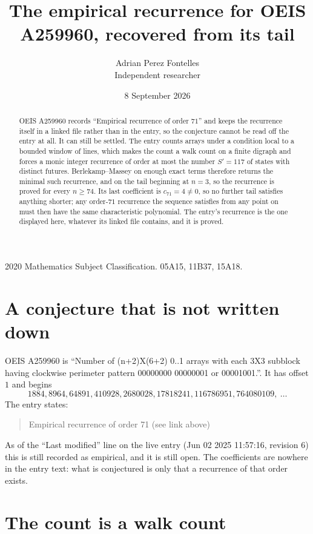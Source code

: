 \documentclass[11pt,a4paper]{article}
\title{The empirical recurrence for OEIS A259960, recovered from its tail}
\author{Adrian Perez Fontelles\\ \small Independent researcher}
\date{8 September 2026}
\theoremstyle{plain}
\theoremstyle{definition}
\begin{document}
\maketitle

\begin{abstract}
OEIS A259960 records ``Empirical recurrence of order $71$'' and keeps the recurrence itself in
a linked file rather than in the entry, so the conjecture cannot be read off the entry at all.
It can still be settled. The entry counts arrays under a condition local to a bounded window of
lines, which makes the count a walk count on a finite digraph and forces a monic integer
recurrence of order at most the number $S'=117$ of states with distinct futures. Berlekamp--Massey on
enough exact terms therefore returns the minimal such recurrence, and on the tail beginning at $n=3$, so the recurrence is proved for every $n\ge74$.
Its last coefficient is $c_{71}=4\neq0$, so no further tail satisfies anything
shorter; any order-$71$ recurrence the sequence satisfies from any point on must then have
the same characteristic polynomial. The entry's recurrence is the one displayed here, whatever
its linked file contains, and it is proved.
\end{abstract}

\noindent\small 2020 Mathematics Subject Classification. 05A15, 11B37, 15A18.\normalsize

\section{A conjecture that is not written down}

OEIS A259960 is ``Number of (n+2)X(6+2) 0..1 arrays with each 3X3 subblock having clockwise perimeter pattern 00000000 00000001 or 00001001.''. It has offset $1$ and begins
\[
1884, 8964, 64891, 410928, 2680028, 17818241, 116786951, 764080109,\ \dots
\]
The entry states:
\begin{quote}
Empirical recurrence of order 71 (see link above)
\end{quote}
As of the ``Last modified'' line on the live entry (Jun 02 2025 11:57:16, revision 6)
this is still recorded as empirical, and it is still open. The coefficients are nowhere in the
entry text: what is conjectured is only that a recurrence of that order exists.

\section{The count is a walk count}
\end{document}
